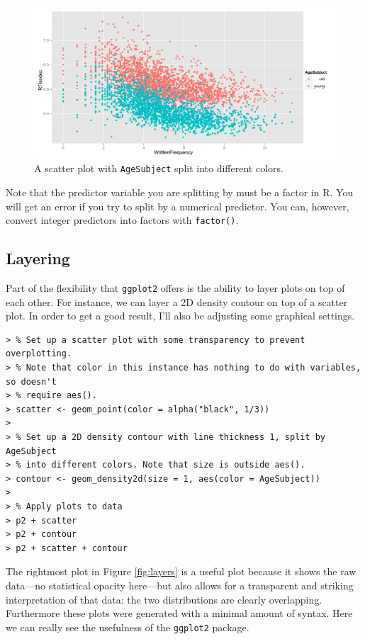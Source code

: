 \documentclass[oneside, 10pt]{article}
\begin{document}
\begin{figure}[htbp]
  \centering
  \includegraphics[width = 0.80\linewidth]{points-color}
  \caption{A scatter plot with \texttt{AgeSubject} split into different colors.}
  \label{fig:points-color}
\end{figure}

Note that the predictor variable you are splitting by must be a factor in R. You will get an error if you try to split by a numerical predictor. You can, however, convert integer predictors into factors with \verb!factor()!.

\subsection{Layering}

Part of the flexibility that \verb!ggplot2! offers is the ability to layer plots on top of each other. For instance, we can layer a 2D density contour on top of a scatter plot. In order to get a good result, I'll also be adjusting some graphical settings.

\begin{verbatim}
> % Set up a scatter plot with some transparency to prevent overplotting.
> % Note that color in this instance has nothing to do with variables, so doesn't 
> % require aes().
> scatter <- geom_point(color = alpha("black", 1/3))
>
> % Set up a 2D density contour with line thickness 1, split by AgeSubject
> % into different colors. Note that size is outside aes().
> contour <- geom_density2d(size = 1, aes(color = AgeSubject))
>
> % Apply plots to data
> p2 + scatter
> p2 + contour
> p2 + scatter + contour
\end{verbatim}

The rightmost plot in Figure \ref{fig:layers} is a useful plot because it shows the raw data---no statistical opacity here---but also allows for a transparent and striking interpretation of that data: the two distributions are clearly overlapping. Furthermore these plots were generated with a minimal amount of syntax. Here we can really see the usefulness of the \verb!ggplot2! package.
\end{document}
